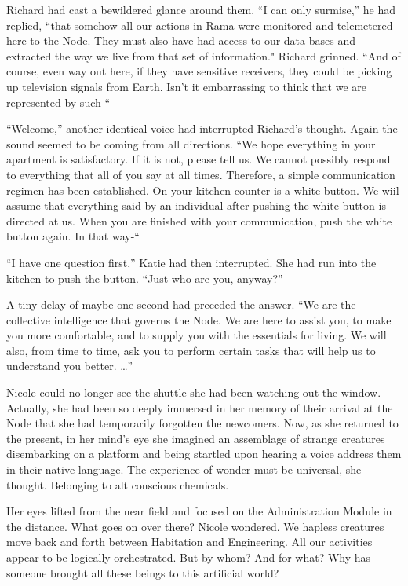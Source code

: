 \documentclass[]{article}
\begin{document}
{Richard had cast a bewildered glance around them.  “I can only surmise,” he had replied, “that somehow all our actions in Rama were monitored and telemetered here to the Node.  They must also have had access to our data bases and extracted the way we live from that set of information."  Richard grinned.  “And of course, even way out here, if they have sensitive receivers, they could be picking up television signals from Earth.  Isn’t it embarrassing to think that we are represented by such-“

“Welcome,” another identical voice had interrupted Richard’s thought.  Again the sound seemed to be coming from all directions.  “We hope everything in your apartment is satisfactory.  If it is not, please tell us.  We cannot possibly respond to everything that all of you say at all times.  Therefore, a simple communication regimen has been established.  On your kitchen counter is a white button.  We wiil assume that everything said by an individual after pushing the white button is directed at us.  When you are finished with your communication, push the white button again.  In that way-“

“I have one question first,” Katie had then interrupted.  She had run into the kitchen to push the button.  “Just who are you, anyway?”

A tiny delay of maybe one second had preceded the answer.  “We are the collective intelligence that governs the Node.  We are here to assist you, to make you more comfortable, and to supply you with the essentials for living.  We will also, from time to time, ask you to perform certain tasks that will help us to understand you better.  …”

Nicole could no longer see the shuttle she had been watching out the window.  Actually, she had been so deeply immersed in her memory of their arrival at the Node that she had temporarily forgotten the newcomers.  Now, as she returned to the present, in her mind’s eye she imagined an assemblage of strange creatures disembarking on a platform and being startled upon hearing a voice address them in their native language.  The experience of wonder must be universal, she thought.  Belonging to alt conscious chemicals.

Her eyes lifted from the near field and focused on the Administration Module in the distance.  What goes on over there? Nicole wondered.  We hapless creatures move back and forth between Habitation and Engineering.  All our activities appear to be logically orchestrated.  But by whom? And for what? Why has someone brought all these beings to this artificial world?

}
\end{document}
